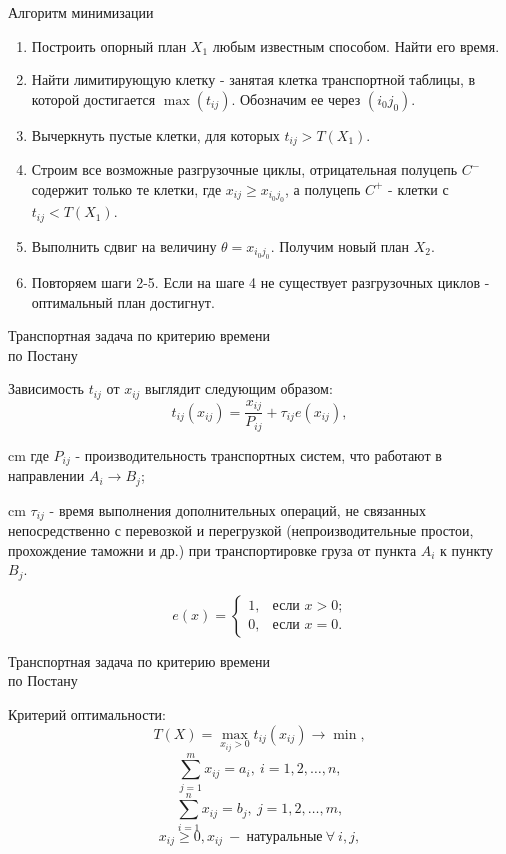 \documentclass[serif,10pt,utf8, russian]{beamer}
\begin{document}
\begin{frame}{\begin{center}Алгоритм минимизации\end{center}}
\begin{enumerate}
\item Построить опорный план $X_1$ любым известным способом. Найти его время.
\pause
\item Найти лимитирующую клетку - занятая клетка транспортной таблицы, в которой достигается $\max{\left(t_{ij}\right)}$. Обозначим ее через $\left(i_0 j_0\right)$.
\pause
\item Вычеркнуть пустые клетки, для которых $t_{ij}>T\left(X_1\right)$.
\pause
\item Строим все возможные разгрузочные циклы, отрицательная полуцепь $C^{-}$ содержит только те клетки, где $x_{ij}\ge x_{i_0 j_0}$, а полуцепь $C^{+}$ - клетки с $t_{ij}<T\left(X_1\right)$.
\pause
\item Выполнить сдвиг на величину $\theta = x_{i_0 j_0}$. Получим новый план $X_2$.
\pause
\item Повторяем шаги 2-5. Если на шаге 4 не существует разгрузочных циклов - оптимальный план достигнут.
\end{enumerate}
\end{frame}

\begin{frame}{\begin{center}Транспортная задача по критерию времени\\ по Постану\end{center}}
\par{Зависимость $t_{ij}$ от $x_{ij}$ выглядит следующим образом:}
\pause
$$t_{ij}\left(x_{ij}\right)=\frac{x_{ij}}{P_{ij}} + \tau_{ij}e\left(x_{ij}\right),$$
\pause
\parbox{11 cm}{ cm где $P_{ij}$ - производительность транспортных систем, что работают в направлении $A_i \rightarrow B_j$;}
\pause
\parbox{11 cm}{ cm $\tau_{ij}$ - время выполнения дополнительных операций, не связанных непосредственно с перевозкой и перегрузкой (непроизводительные простои, прохождение таможни и др.) при транспортировке груза от пункта $A_i$ к пункту $B_j$.}
\pause
$$e\left(x\right) = \begin{cases}
1, & \text{если $x>0$;}\\
0, & \text{если $x=0$.}
\end{cases}$$
\end{frame}

\begin{frame}{\begin{center}Транспортная задача по критерию времени \\по Постану\end{center}}
\par{Критерий оптимальности:}
\pause
$$T\left(X\right) = \max_{x_{ij}>0}{t_{ij}\left(x_{ij}\right)} \rightarrow \min,$$
\pause
$$\sum_{j=1}^{m}{x_{ij}}=a_{i},\ i=1,2,\dots,n,$$
$$\sum_{i=1}^{n}{x_{ij}}=b_{j},\ j=1,2,\dots,m,$$
\pause
$$x_{ij}\ge 0, x_{ij}\ -\ \text{натуральные}\ \forall\ i,j,$$
\end{frame}
\end{document}
